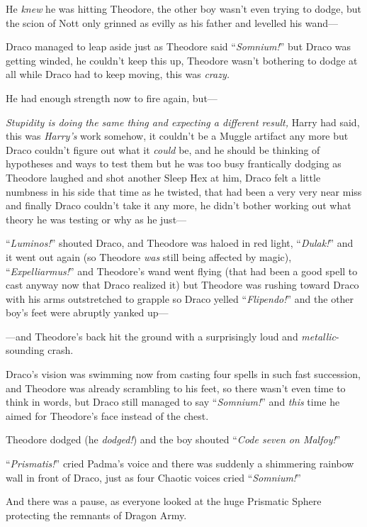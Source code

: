 He \emph{knew} he was hitting Theodore, the other boy wasn’t even trying to dodge, but the scion of Nott only grinned as evilly as his father and levelled his wand—

Draco managed to leap aside just as Theodore said “\emph{Somnium!}” but Draco was getting winded, he couldn’t keep this up, Theodore wasn’t bothering to dodge at all while Draco had to keep moving, this was \emph{crazy.}

He had enough strength now to fire again, but—

\emph{Stupidity is doing the same thing and expecting a different result,} Harry had said, this was \emph{Harry’s} work somehow, it couldn’t be a Muggle artifact any more but Draco couldn’t figure out what it \emph{could} be, and he should be thinking of hypotheses and ways to test them but he was too busy frantically dodging as Theodore laughed and shot another Sleep Hex at him, Draco felt a little numbness in his side that time as he twisted, that had been a very very near miss and finally Draco couldn’t take it any more, he didn’t bother working out what theory he was testing or why as he just—

“\emph{Luminos!}” shouted Draco, and Theodore was haloed in red light, “\emph{Dulak!}” and it went out again (so Theodore \emph{was} still being affected by magic), “\emph{Expelliarmus!}” and Theodore’s wand went flying (that had been a good spell to cast anyway now that Draco realized it) but Theodore was rushing toward Draco with his arms outstretched to grapple so Draco yelled “\emph{Flipendo!}” and the other boy’s feet were abruptly yanked up—

—and Theodore’s back hit the ground with a surprisingly loud and \emph{metallic}-sounding crash.

Draco’s vision was swimming now from casting four spells in such fast succession, and Theodore was already scrambling to his feet, so there wasn’t even time to think in words, but Draco still managed to say “\emph{Somnium!}” and \emph{this} time he aimed for Theodore’s face instead of the chest.

Theodore dodged (he \emph{dodged!}) and the boy shouted “\emph{Code seven on Malfoy!}”

“\emph{Prismatis!}” cried Padma’s voice and there was suddenly a shimmering rainbow wall in front of Draco, just as four Chaotic voices cried “\emph{Somnium!}”

And there was a pause, as everyone looked at the huge Prismatic Sphere protecting the remnants of Dragon Army.


